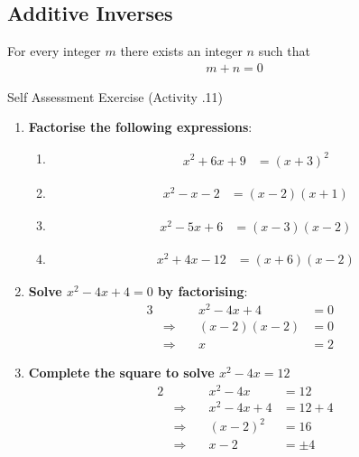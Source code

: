 \documentclass[../notes.tex]{subfiles}
\begin{document}
			\subsection{Additive Inverses}
				For every integer $m$ there exists an integer $n$ such that
				\begin{align*}
					m + n = 0
				\end{align*}
			\pagebreak
			\begin{exercise}{Self Assessment Exercise (Activity \thechapter.11)}
				\begin{enumerate}
					\item \textbf{Factorise the following expressions}:
						\begin{enumerate}[label=(\alph*)]
							\item
								\begin{align*}
									x^{2} + 6x + 9 &= (x + 3)^{2}
								\end{align*}
							\item
								\begin{align*}
									x^{2} - x - 2 &= (x - 2)(x + 1)
								\end{align*}
							\item
								\begin{align*}
									x^{2} - 5x + 6 &= (x - 3)(x - 2)
								\end{align*}
							\item
								\begin{align*}
									x^{2} + 4x - 12 &= (x + 6)(x - 2)
								\end{align*}
						\end{enumerate}
					\item \textbf{Solve $x^{2} - 4x + 4 = 0$ by factorising}:
						\begin{alignat*}{3}
							& \qquad & x^{2} - 4x + 4 &= 0\\
							& \Rightarrow \quad & (x - 2)(x - 2) &= 0\\
							& \Rightarrow \quad &x &= 2 &
						\end{alignat*}
					\item \textbf{Complete the square to solve $x^{2} - 4x = 12$}
						\begin{alignat*}{2}
							& \qquad &x^{2} - 4x &= 12\\
							& \Rightarrow \quad &x^{2} - 4x + 4 &= 12 + 4\\
							& \Rightarrow \quad &(x - 2)^{2} &= 16\\
							& \Rightarrow \quad & x - 2 &= \pm 4

\end{alignat*}
\end{enumerate}
\end{exercise}
\end{document}
